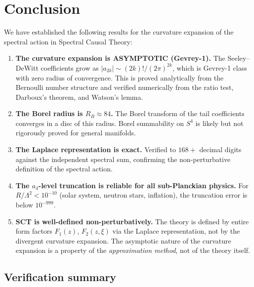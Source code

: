 \documentclass[11pt,a4paper]{article}
\newcommand{\Lam}{\Lambda}
\theoremstyle{plain}
\theoremstyle{definition}
\begin{document}
\section{Conclusion}\label{sec:conclusion}

We have established the following results for the curvature expansion of
the spectral action in Spectral Causal Theory:

\begin{enumerate}
  \item \textbf{The curvature expansion is ASYMPTOTIC (Gevrey-1).}
    The Seeley--DeWitt coefficients grow as $|a_{2k}| \sim (2k)!/(2\pi)^{2k}$,
    which is Gevrey-1 class with zero radius of convergence.  This is proved
    analytically from the Bernoulli number structure and verified numerically
    from the ratio test, Darboux's theorem, and Watson's lemma.

  \item \textbf{The Borel radius is $R_B \approx 84$.}
    The Borel transform of the tail coefficients converges in a disc of
    this radius.  Borel summability on $S^4$ is likely but not rigorously
    proved for general manifolds.

  \item \textbf{The Laplace representation is exact.}
    Verified to $168{+}$ decimal digits against the independent spectral
    sum, confirming the non-perturbative definition of the spectral action.

  \item \textbf{The $a_4$-level truncation is reliable for all
    sub-Planckian physics.}  For $R/\Lam^2 < 10^{-10}$ (solar system,
    neutron stars, inflation), the truncation error is below $10^{-999}$.

  \item \textbf{SCT is well-defined non-perturbatively.}
    The theory is defined by entire form factors $F_1(z)$, $F_2(z,\xi)$
    via the Laplace representation, not by the divergent curvature expansion.
    The asymptotic nature of the curvature expansion is a property of the
    \emph{approximation method}, not of the theory itself.
\end{enumerate}

\subsection{Verification summary}
\end{document}
